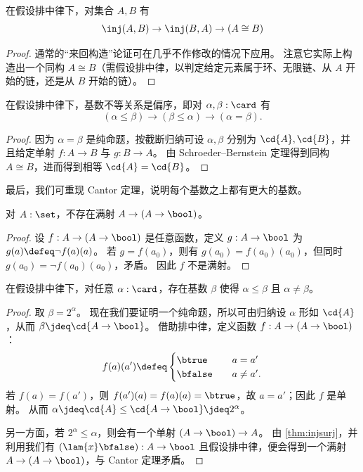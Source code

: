 \begin{thm}
  在假设排中律下，对集合 $A,B$ 有
  \[ \inj(A,B) \to \inj(B,A) \to (A\cong B) \]
\end{thm}
\begin{proof}
  通常的“来回构造”论证可在几乎不作修改的情况下应用。
  注意它实际上构造出一个同构 $A\cong B$（需假设排中律，以判定给定元素属于环、无限链、从 $A$ 开始的链，还是从 $B$ 开始的链）。
\end{proof}

\begin{cor}
  在假设排中律下，基数不等关系是偏序，即对 $\alpha,\beta:\card$ 有
  \[ (\alpha\le\beta) \to (\beta\le\alpha) \to (\alpha=\beta). \]
\end{cor}
\begin{proof}
  因为 $\alpha=\beta$ 是纯命题，按截断归纳可设 $\alpha,\beta$ 分别为 $\cd{A},\cd{B}$，并且给定单射 $f:A\to B$ 与 $g:B\to A$。
  由 Schroeder--Bernstein 定理得到同构 $A\cong B$，进而得到相等 $\cd{A}=\cd{B}$。
\end{proof}

最后，我们可重现 Cantor 定理，说明每个基数之上都有更大的基数。

\begin{thm}[Cantor]
  对 $A:\set$，不存在满射 $A \to (A\to \bool)$。
\end{thm}
\begin{proof}
  设 $f:A \to (A\to \bool)$ 是任意函数，定义 $g:A\to \bool$ 为 $g(a) \defeq \neg f(a)(a)$。
  若 $g = f(a_0)$，则有 $g(a_0) = f(a_0)(a_0)$，但同时 $g(a_0) = \neg f(a_0)(a_0)$，矛盾。
  因此 $f$ 不是满射。
\end{proof}

\begin{cor}
  在假设排中律下，对任意 $\alpha:\card$，存在基数 $\beta$ 使得 $\alpha\le\beta$ 且 $\alpha\neq\beta$。
\end{cor}
\begin{proof}
  取 $\beta = 2^\alpha$。
  现在我们要证明一个纯命题，所以可由归纳设 $\alpha$ 形如 $\cd{A}$，从而 $\beta\jdeq \cd{A\to \bool}$。
  借助排中律，定义函数 $f:A\to (A\to \bool)$：
  \[f(a)(a') \defeq
  \begin{cases}
    \btrue &\quad a=a'\\
    \bfalse &\quad a\neq a'.
  \end{cases}
  \]
  若 $f(a)=f(a')$，则 $f(a')(a) = f(a)(a) = \btrue$，故 $a=a'$；因此 $f$ 是单射。
  从而 $\alpha \jdeq \cd{A} \le \cd{A\to \bool} \jdeq 2^\alpha$。

  另一方面，若 $2^\alpha \le \alpha$，则会有一个单射 $(A\to\bool)\to A$。
  由 \cref{thm:injsurj}，并利用我们有 $(\lam{x} \bfalse):A\to \bool$ 且假设排中律，便会得到一个满射 $A \to (A\to \bool)$，与 Cantor 定理矛盾。
\end{proof}
